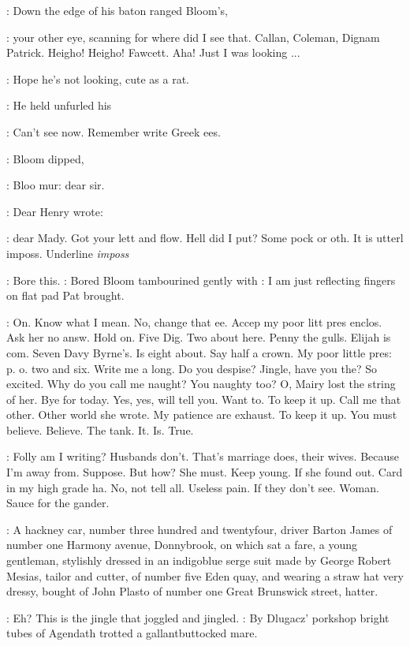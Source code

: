 :
Down the edge of his  baton ranged Bloom's,

\BloomInt:
your other eye,
scanning for where did I see that.
Callan,
Coleman,
Dignam Patrick.
Heigho!
Heigho!
Fawcett.
Aha!
Just I was looking ...

\BloomInt:
Hope he's not looking,
cute as a rat.

:
He held unfurled his 

\BloomInt:
Can't see now.
Remember write Greek ees.

:
Bloom dipped,

\BloomInt:
Bloo mur:
dear sir.

:
Dear Henry wrote:

\BloomInt:
dear Mady.
Got your lett and flow.
Hell did I put?
Some pock or oth.
It is utterl imposs.
Underline \emph{imposs}

\BloomInt:
Bore this.
:
Bored Bloom tambourined gently with
\BloomInt:
I am just reflecting
fingers on flat pad Pat brought.

\BloomInt:
On.
Know what I mean.
No,
change that ee.
Accep my poor litt pres
enclos.
Ask her no answ.
Hold on.
Five Dig.
Two about here.
Penny the
gulls.
Elijah is com.
Seven Davy Byrne's.
Is eight about.
Say half a
crown.
My poor little pres:
p.
o.
two and six.
Write me a long.
Do you
despise?
Jingle,
have you the?
So excited.
Why do you call me naught?
You naughty too?
O,
Mairy lost the string of her.
Bye for today.
Yes,
yes,
will tell you.
Want to.
To keep it up.
Call me that other.
Other world she
wrote.
My patience are exhaust.
To keep it up.
You must believe.
Believe.
The tank.
It.
Is.
True.

\BloomInt:
Folly am I writing?
Husbands don't.
That's marriage does,
their
wives.
Because I'm away from.
Suppose.
But how?
She must.
Keep young.
If she found out.
Card in my high grade ha.
No,
not tell all.
Useless
pain.
If they don't see.
Woman.
Sauce for the gander.

:
A hackney car,
number three hundred and twentyfour,
driver Barton James of
number one Harmony avenue,
Donnybrook,
on which sat a fare,
a young gentleman,
stylishly dressed in an indigoblue serge suit made by
George Robert Mesias,
tailor and cutter,
of number five Eden quay,
and
wearing a straw hat very dressy,
bought of John Plasto of number one
Great Brunswick street,
hatter.

\BloomInt:
Eh?
This is the jingle that joggled and jingled.
:
By Dlugacz' porkshop bright tubes of Agendath trotted a
gallantbuttocked mare.

